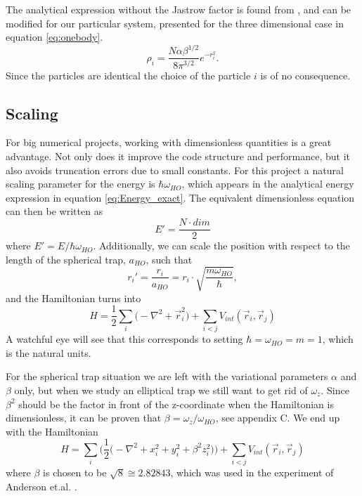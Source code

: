 \documentclass[norsk,a4paper,12pt]{article}
\begin{document}
The analytical expression without the Jastrow factor is found from \cite{DuBois}, and can be modified for our particular system, presented for the three dimensional case in equation \ref{eq:onebody}.
\begin{equation}
\rho_i=\frac{N\alpha\beta^{1/2}}{8\pi^{3/2}}e^{-r_i^2}.
\label{eq:onebody}
\end{equation}
Since the particles are identical the choice of the particle $i$ is of no consequence. 

\subsection{Scaling} \label{sec:scaling}
For big numerical projects, working with dimensionless quantities is a great advantage. Not only does it improve the code structure and performance, but it also avoids truncation errors due to small constants. For this project a natural scaling parameter for the energy is $\hbar\omega_{HO}$, which appears in the analytical energy expression in equation \ref{eq:Energy_exact}. The equivalent dimensionless equation can then be written as
\begin{equation}
E'=\frac{N\cdot dim}{2}
\end{equation}
where $E'=E/\hbar\omega_{HO}$. Additionally, we can scale the position with respect to the length of the spherical trap, $a_{HO}$, such that 
\begin{equation}
r_i'=\frac{r_i}{a_{HO}}=r_i\cdot\sqrt{\frac{m\omega_{HO}}{\hbar}},
\end{equation}
and the Hamiltonian turns into
\begin{equation}
H=\frac{1}{2}\sum_i\Big(-\nabla^2 + \vec{r}_i^2\Big)+\sum_{i<j}V_{int}(\vec{r}_i,\vec{r}_j)
\end{equation}
A watchful eye will see that this corresponds to setting $\hbar=\omega_{HO}=m=1$, which is the natural units. 

For the spherical trap situation we are left with the variational parameters $\alpha$ and $\beta$ only, but when we study an elliptical trap we still want to get rid of $\omega_z$. Since $\beta^2$ should be the factor in front of the z-coordinate when the Hamiltonian is dimensionless, it can be proven that $\beta=\omega_z/\omega_{HO}$, see appendix C. We end up with the Hamiltonian
\begin{equation}
H=\sum_i\bigg(\frac{1}{2}\Big(-\nabla^2 + x_i^2 + y_i^2 + \beta^2z_i^2\Big)\bigg)+\sum_{i<j}V_{int}(\vec{r}_i,\vec{r}_j)
\end{equation} 
where $\beta$ is chosen to be $\sqrt{8}\cong2.82843$, which was used in the experiment of Anderson et.al. \cite{Anderson}.
\end{document}
